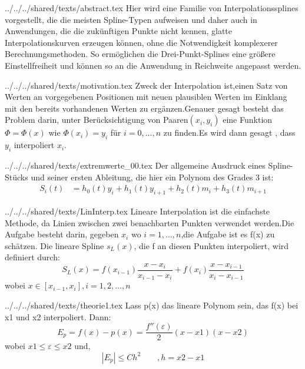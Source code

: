 \begin{filecontents*}[overwrite]{../../../shared/texts/abstract.tex}
Hier wird eine Familie von Interpolationssplines vorgestellt, die 
die meisten Spline-Typen aufweisen und daher auch in Anwendungen, 
die die zukünftigen Punkte nicht kennen, glatte Interpolationskurven
erzeugen können, ohne die Notwendigkeit komplexerer Berechnungsmethoden.
So ermöglichen die Drei-Punkt-Splines eine größere Einstellfreiheit 
und können so an die Anwendung in Reichweite angepasst werden.
\end{filecontents*}
%
\begin{filecontents*}[overwrite]{../../../shared/texts/motivation.tex}
Zweck der Interpolation ist,einen Satz von Werten an vorgegebenen 
Positionen mit neuen plausiblen Werten im Einklang mit den bereits 
vorhandenen Werten zu ergänzen.Genauer gesagt besteht das Problem darin,
unter Berücksichtigung von Paaren\((x_i,y_i)\) eine Funktion
\(\Phi = \Phi(x)\) wie \(\Phi(x_i) =y_i\) für \(i= 0,\dots,n\) zu 
finden.Es wird dann gesagt , dass \(y_i\) interpoliert \(x_i\).
%
\end{filecontents*}

\begin{filecontents*}[overwrite]{../../../shared/texts/extremwerte_00.tex}
Der allgemeine Ausdruck eines Spline-Stücks und seiner ersten Ableitung, 
die hier ein Polynom des Grades 3 ist:
\begin{align*}
S_i(t) &= h_0(t)y_i+h_1(t)y_{i+1}+h_2(t)m_i+h_3(t)m_{i+1}
\end{align*}
\end{filecontents*}

\begin{filecontents*}[overwrite]{../../../shared/texts/LinInterp.tex}
Lineare Interpolation ist die einfachste Methode, da Linien zwischen
zwei benachbarten Punkten verwendet werden.Die Aufgabe besteht darin,
gegeben \(x_i\) wo \(i=1,\dots,n\),die Aufgabe ist es f(x) zu schätzen.
Die lineare Spline \(s_L{}(x)\), die f an diesen Punkten interpoliert,
wird definiert durch:\cite{lecture17}
\[S_L{}(x)=f(x_{i-1}) \frac{x - x_i}{x_{i-1}-x_i} + f(x_i) \frac{x - x_{i-1}}{x_i - x_{i-1}}\]
wobei \(x \in [x_{i-1},x_i],i = 1,2,\dots,n\)
\end{filecontents*}

\begin{filecontents*}[overwrite]{../../../shared/texts/theorie1.tex}
Lass p(x) das lineare Polynom sein, das f(x) bei x1 und x2 interpoliert.
Dann:
\[E_p = f(x) - p(x)= \frac{f''(\varepsilon)}{2} (x-x1)(x-x2)\] wobei
\(x1 \leq \varepsilon \leq x2\) und,\[|E_p| \leq C h^2 \hspace{2em} ,h=x2 - x1\]
\end{filecontents*}

